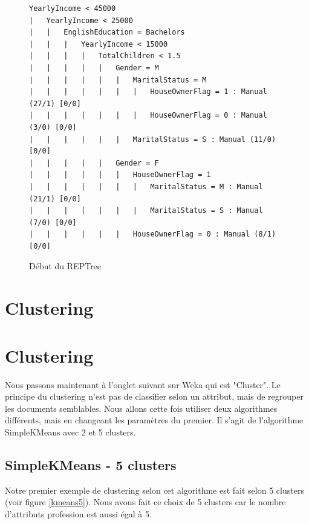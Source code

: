 \begin{figure}[H]
\centering
\begin{lstlisting}
YearlyIncome < 45000
|   YearlyIncome < 25000
|   |   EnglishEducation = Bachelors
|   |   |   YearlyIncome < 15000
|   |   |   |   TotalChildren < 1.5
|   |   |   |   |   Gender = M
|   |   |   |   |   |   MaritalStatus = M
|   |   |   |   |   |   |   HouseOwnerFlag = 1 : Manual (27/1) [0/0]
|   |   |   |   |   |   |   HouseOwnerFlag = 0 : Manual (3/0) [0/0]
|   |   |   |   |   |   MaritalStatus = S : Manual (11/0) [0/0]
|   |   |   |   |   Gender = F
|   |   |   |   |   |   HouseOwnerFlag = 1
|   |   |   |   |   |   |   MaritalStatus = M : Manual (21/1) [0/0]
|   |   |   |   |   |   |   MaritalStatus = S : Manual (7/0) [0/0]
|   |   |   |   |   |   HouseOwnerFlag = 0 : Manual (8/1) [0/0]
\end{lstlisting}
\caption{Début du REPTree}
\label{lst:reptree_sample}
\end{figure}


\section{Clustering}

\section{Clustering}

    Nous passons maintenant à l'onglet suivant sur Weka qui est "Cluster". Le principe du clustering n'est pas de classifier selon un attribut, mais de regrouper les documents semblables. Nous allons cette fois utiliser deux algorithmes différents, mais en changeant les paramètres du premier. Il s'agit de l'algorithme SimpleKMeans avec 2 et 5 clusters.


\subsection*{SimpleKMeans - 5 clusters}

    Notre premier exemple de clustering selon cet algorithme est fait selon 5 clusters (voir figure \ref{kmeans5}). Nous avons fait ce choix de 5 clusters car le nombre d'attributs profession est aussi égal à 5.

